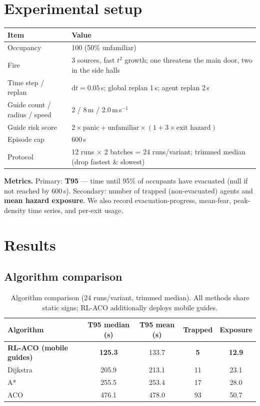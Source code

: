 \documentclass[11pt,a4paper]{article}
\begin{document}
\section{Experimental setup}

\begin{center}
\begin{tabular}{ll}
\toprule
Item & Value \\
\midrule
Occupancy & 100 (50\% unfamiliar) \\
Fire & 3 sources, fast $t^2$ growth; one threatens the main door, two in the side halls \\
Time step / replan & $\mathrm{d}t=0.05$\,s; global replan 1\,s; agent replan 2\,s \\
Guide count / radius / speed & 2 / 8\,m / 2.0\,m\,s$^{-1}$ \\
Guide risk score & $2\times\text{panic} + \text{unfamiliar}\times(1+3\times\text{exit hazard})$ \\
Episode cap & 600\,s \\
Protocol & 12 runs $\times$ 2 batches = 24 runs/variant; trimmed median (drop fastest \& slowest) \\
\bottomrule
\end{tabular}
\end{center}

\textbf{Metrics.} Primary: \textbf{T95} --- time until 95\% of occupants have evacuated (null if not
reached by 600\,s). Secondary: number of trapped (non-evacuated) agents and \textbf{mean hazard
exposure}. We also record evacuation-progress, mean-fear, peak-density time series, and per-exit
usage.

\section{Results}

\subsection{Algorithm comparison}

\begin{table}[h]
\centering
\caption{Algorithm comparison (24 runs/variant, trimmed median). All methods share static signs;
RL-ACO additionally deploys mobile guides.}
\begin{tabular}{lcccc}
\toprule
Algorithm & T95 median (s) & T95 mean (s) & Trapped & Exposure \\
\midrule
\textbf{RL-ACO (mobile guides)} & \textbf{125.3} & 133.7 & \textbf{5} & \textbf{12.9} \\
Dijkstra & 205.9 & 213.1 & 11 & 23.1 \\
A* & 255.5 & 253.4 & 17 & 28.0 \\
ACO & 476.1 & 478.0 & 93 & 50.7 \\
\bottomrule
\end{tabular}
\end{table}
\end{document}
